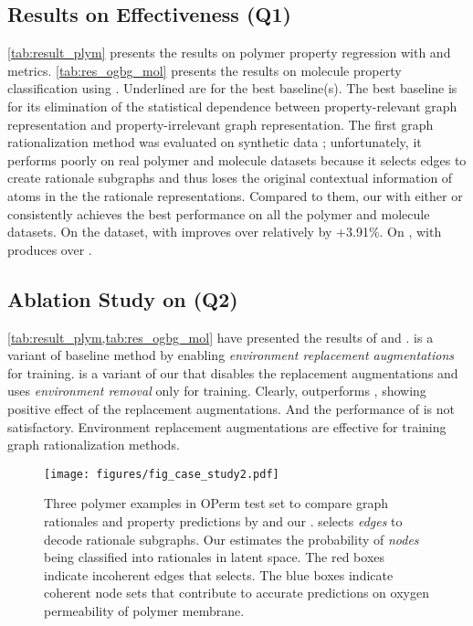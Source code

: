 \documentclass[sigconf]{acmart}
\begin{document}
\subsection{Results on Effectiveness (Q1)}\label{sec:q1_effectivene}
\cref{tab:result_plym} presents the results on polymer property regression with \regreRSquare and \regreRMSE metrics.
\cref{tab:res_ogbg_mol} presents the results on molecule property classification using \classifyAUC.
Underlined are for the best baseline(s).
The best baseline is \oodgnn for its elimination of the statistical dependence between property-relevant graph representation and property-irrelevant graph representation. The first graph rationalization method \dir was evaluated on synthetic data \cite{wu2022discovering}; unfortunately, it performs poorly on real polymer and molecule datasets because it selects edges to create rationale subgraphs and thus loses the original contextual information of atoms in the the rationale representations. Compared to them, our \method with either \gcn or \gin consistently achieves the best performance on all the polymer and molecule datasets. On the \density dataset, \method with \gcn improves \regreRSquare over \oodgnn relatively by +3.91\%. On \meltTemp, \method with \gin produces  \regreRSquare over \dir.

\subsection{Ablation Study on \method (Q2)}\label{sec:q2_abalation}
\cref{tab:result_plym,tab:res_ogbg_mol} have presented the results of \dirplusaug and \methodnoaug. \dirplusaug is a variant of baseline method \dir by enabling \emph{environment replacement augmentations} for training. \methodnoaug is a variant of our \method that disables the replacement augmentations and uses \emph{environment removal} only for training.
Clearly, \dirplusaug outperforms \dir, showing positive effect of the replacement augmentations.
And the performance of \methodnoaug is not satisfactory. Environment replacement augmentations are effective for training graph rationalization methods.

\begin{figure}[t]
    \centering
    \texttt{[image: figures/fig\_case\_study2.pdf]}
    \vspace{-0.1in}
    \caption{Three polymer examples in OPerm test set to compare graph rationales and property predictions by \dir \cite{wu2022discovering} and our \method. \dir selects \emph{edges} to decode rationale subgraphs. Our \method estimates the probability of \emph{nodes} being classified into rationales in latent space. The red boxes indicate incoherent edges that \dir selects. The blue boxes indicate coherent node sets that contribute to accurate predictions on oxygen permeability of polymer membrane.}
    \label{fig:case_study}
    \vspace{-0.15in}
\end{figure}
\end{document}
